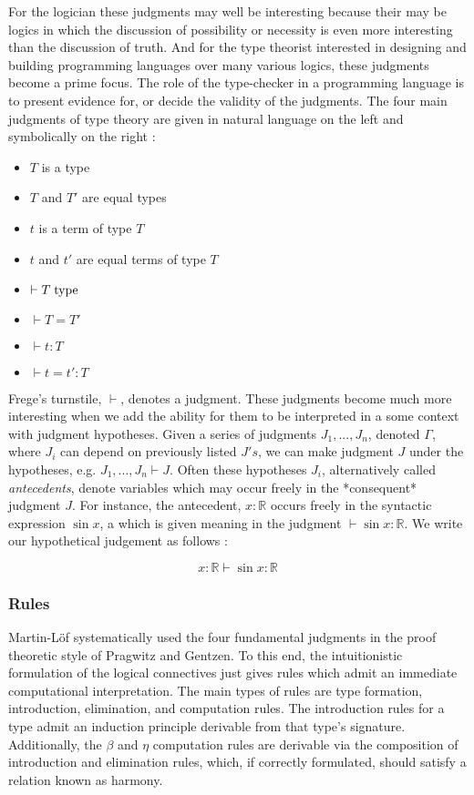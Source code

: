 For the logician these judgments may well be interesting because their may be
logics in which the discussion of possibility or necessity is even more
interesting than the discussion of truth. And for the type theorist interested
in designing and building programming languages over many various logics, these
judgments become a prime focus. The role of the type-checker in a programming
language is to present evidence for, or decide the validity of the judgments.
The four main judgments of type theory are given in natural language on the left
and symbolically on the right :

\begin{multicols}{2}
\begin{itemize}
\item $T$ is a type
\item $T$ and $T'$ are equal types
\item $t$ is a term of type $T$
\item $t$ and $t'$ are equal terms of type $T$
\item $\vdash T \; {\rm type}$
\item $\vdash T = T'$
\item $\vdash t:T$
\item $\vdash t = t':T$
\end{itemize}
\end{multicols}

Frege's turnstile, $\vdash$, denotes a judgment. These judgments become much more interesting when we add the ability for them to
be interpreted in a some context with judgment hypotheses. Given a series of
judgments $J_1,...,J_n$, denoted $\Gamma$, where $J_i$ can depend on previously
listed $J's$, we can make judgment $J$ under the hypotheses, e.g. $J_1,...,J_n
\vdash J$. Often these hypotheses $J_i$, alternatively called \emph{antecedents},
denote variables which may occur freely in the *consequent* judgment $J$. For
instance, the antecedent, $x : \mathbb{R}$ occurs freely in the syntactic
expression $\sin x$, a which is given meaning in the judgment $\vdash \sin x { :
} \mathbb{R}$. We write our hypothetical judgement as follows :

$$x : \mathbb{R} \vdash \sin x : \mathbb{R}$$



\subsubsection{Rules}

Martin-Löf systematically used the four fundamental judgments in the proof
theoretic style of Pragwitz and Gentzen. To this end, the intuitionistic formulation of the
logical connectives just gives rules which admit an immediate computational
interpretation. The main types of rules are type formation, introduction,
elimination, and computation rules. The introduction rules for a type admit an
induction principle derivable from that type's signature. Additionally, the
$\beta$ and $\eta$ computation rules are derivable via the composition of
introduction and elimination rules, which, if correctly formulated, should
satisfy a relation known as harmony.

